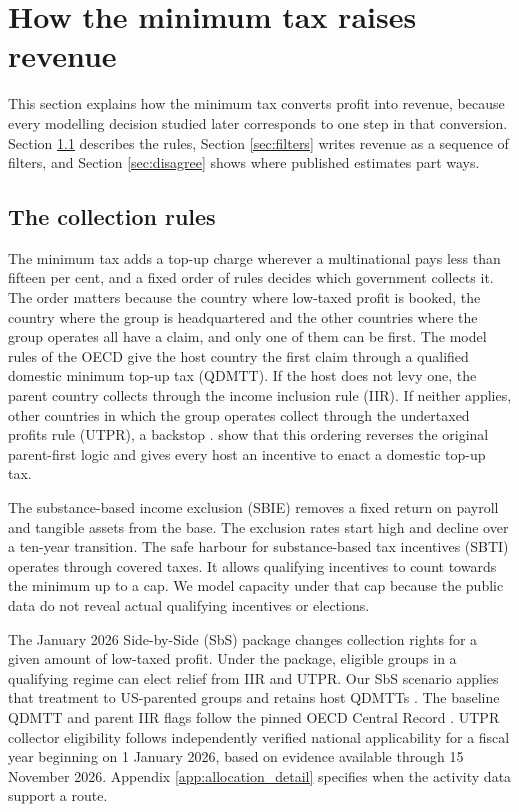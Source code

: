 \documentclass[11pt,a4paper]{article}
\begin{document}
\section{How the minimum tax raises revenue}\label{sec:institutions}

This section explains how the minimum tax converts profit into revenue, because every modelling decision studied later corresponds to one step in that conversion. Section \ref{sec:rules} describes the rules, Section \ref{sec:filters} writes revenue as a sequence of filters, and Section \ref{sec:disagree} shows where published estimates part ways.

\subsection{The collection rules}\label{sec:rules}

The minimum tax adds a top-up charge wherever a multinational pays less than fifteen per cent, and a fixed order of rules decides which government collects it. The order matters because the country where low-taxed profit is booked, the country where the group is headquartered and the other countries where the group operates all have a claim, and only one of them can be first. The model rules of the OECD give the host country the first claim through a qualified domestic minimum top-up tax (QDMTT). If the host does not levy one, the parent country collects through the income inclusion rule (IIR). If neither applies, other countries in which the group operates collect through the undertaxed profits rule (UTPR), a backstop \citep{oecd2025}. \citet{devereux2022} show that this ordering reverses the original parent-first logic and gives every host an incentive to enact a domestic top-up tax.

The substance-based income exclusion (SBIE) removes a fixed return on payroll and tangible assets from the base. The exclusion rates start high and decline over a ten-year transition. The safe harbour for substance-based tax incentives (SBTI) operates through covered taxes. It allows qualifying incentives to count towards the minimum up to a cap. We model capacity under that cap because the public data do not reveal actual qualifying incentives or elections.

The January 2026 Side-by-Side (SbS) package changes collection rights for a given amount of low-taxed profit. Under the package, eligible groups in a qualifying regime can elect relief from IIR and UTPR. Our SbS scenario applies that treatment to US-parented groups and retains host QDMTTs \citep{oecd2026}. The baseline QDMTT and parent IIR flags follow the pinned OECD Central Record \citep{oecdCentralRecord2026}. UTPR collector eligibility follows independently verified national applicability for a fiscal year beginning on 1 January 2026, based on evidence available through 15 November 2026. Appendix \ref{app:allocation_detail} specifies when the activity data support a route.
\end{document}
